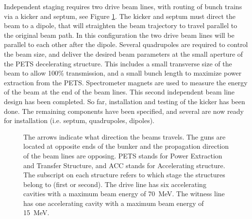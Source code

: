 \label{chp:4}%



Independent staging requires two drive beam lines, with routing of bunch trains via a kicker and septum, 
see Figure \ref{fig:full-staging}. The kicker and septum must direct the beam to a dipole, 
that will straighten the beam trajectory to travel parallel to the original beam path. 
In this configuration the two drive beam lines will be parallel to each other after the dipole.
Several quadrupoles are required to control the beam size, and deliver the desired beam parameters
at the small aperture of the PETS decelerating structure. 
This includes a small transverse size of the beam to allow 100\% transmission, 
and a small bunch length to maximize power extraction from the PETS.
Spectrometer magnets are used to measure the energy of the beam at the end of the beam lines.
This second independent beam line design has been completed. 
So far, installation and testing of the kicker has been done.  
The remaining components have been specified, and several are now ready for installation (i.e. septum, quadrupoles, dipoles).
\begin{figure}
		\begin{center}
		\begin{tikzpicture}[scale=\textwidth/35cm, text=black]
		
		\end{tikzpicture}
	\end{center}
\caption{The arrows indicate what direction the beams travels.
	The guns are located at opposite ends of the bunker and 
	the propagation direction of the beam lines are opposing.
	PETS stands for Power Extraction and Transfer Structure, and ACC stands for Accelerating structure. 
	The subscript on each structure refers to which stage the structures belong to (first or second). 
	The drive line has six accelerating cavities with a maximum beam energy of \SI{70}{MeV}. 
	The witness line has one accelerating cavity with a maximum beam energy of \SI{15}{MeV}.}
\label{fig:full-staging}
\end{figure}

